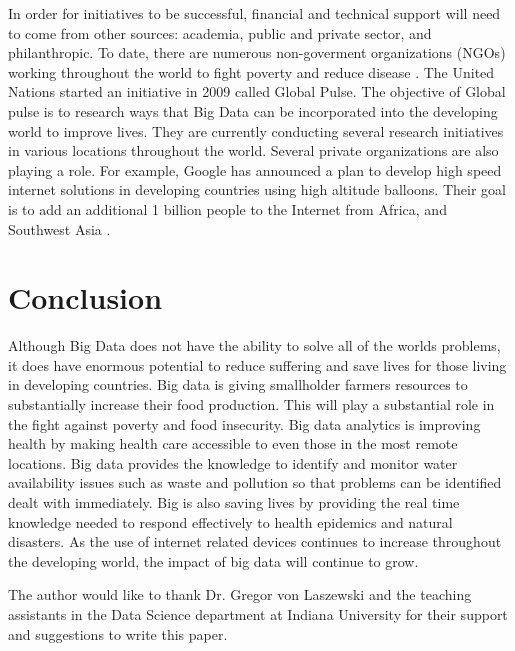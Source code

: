 \documentclass[sigconf]{acmart}
\begin{document}
In order for initiatives to be successful, financial and technical support will need to come from other sources: academia, public and private sector, and philanthropic. To date, there are numerous non-goverment organizations (NGOs) working throughout the world to fight poverty and reduce disease \cite{www-google-Dataflo}. The United Nations started an initiative in 2009 called Global Pulse. The objective of Global pulse is to research ways that Big Data can be incorporated into the developing world to improve lives. They are currently conducting several research initiatives in various locations throughout the world. Several private organizations are also playing a role. For example, Google has announced a plan to develop high speed internet solutions in developing countries using high altitude balloons. Their goal is to add an additional 1 billion people to the Internet from Africa, and Southwest Asia \cite{DevEcon}. 

\section{Conclusion}

Although Big Data does not have the ability to solve all of the worlds problems, it does have enormous potential to reduce suffering and save lives for those living in developing countries. Big data is giving smallholder farmers resources to substantially increase their food production. This will play a substantial role in the fight against poverty and food insecurity. Big data analytics is improving health by making health care accessible to even those in the most remote locations. Big data provides the knowledge to identify and monitor water availability issues such as waste and pollution so that problems can be identified dealt with immediately. Big is also saving lives by providing the real time knowledge needed to respond effectively to health epidemics and natural disasters. As the use of internet related devices continues to increase throughout the developing world, the impact of big data will continue to grow.   







\begin{acks}

  The author would like to thank Dr. Gregor von Laszewski and the teaching assistants in the Data Science department at Indiana University for their support and suggestions to write this paper.

\end{acks}




 
\end{document}
